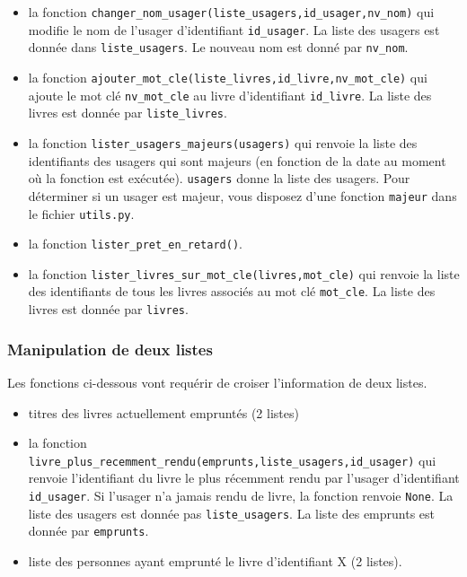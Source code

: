 \documentclass[10pt,a4paper]{sujets-exercices}
\begin{document}
\begin{itemize}

\item la fonction \texttt{changer\_nom\_usager(liste\_usagers,id\_usager,nv\_nom)} qui modifie le nom de l'usager d'identifiant \texttt{id\_usager}. La liste des usagers est donnée dans \texttt{liste\_usagers}. Le nouveau nom est donné par \texttt{nv\_nom}.

\item la fonction \texttt{ajouter\_mot\_cle(liste\_livres,id\_livre,nv\_mot\_cle)} qui ajoute le mot clé \texttt{nv\_mot\_cle} au livre d'identifiant \texttt{id\_livre}. La liste des livres est donnée par \texttt{liste\_livres}.

\item la fonction \texttt{lister\_usagers\_majeurs(usagers)} qui renvoie la liste des identifiants des usagers qui sont majeurs (en fonction de la date au moment où la fonction est exécutée). \texttt{usagers} donne la liste des usagers. Pour déterminer si un usager est majeur, vous disposez d'une fonction \texttt{majeur} dans le fichier \texttt{utils.py}.

\item la fonction \texttt{lister\_pret\_en\_retard()}.

\item la fonction \texttt{lister\_livres\_sur\_mot\_cle(livres,mot\_cle)} qui renvoie la liste des identifiants de tous les livres associés au mot clé \texttt{mot\_cle}. La liste des livres est donnée par \texttt{livres}.

\end{itemize}

\subsubsection{Manipulation de deux listes}

Les fonctions ci-dessous vont requérir de croiser l'information de deux listes.

\begin{itemize}

\item titres des livres actuellement empruntés (2 listes)

\item la fonction \texttt{livre\_plus\_recemment\_rendu(emprunts,liste\_usagers,id\_usager)} qui renvoie l'identifiant du livre le plus récemment rendu par l'usager d'identifiant \texttt{id\_usager}. Si l'usager n'a jamais rendu de livre, la fonction renvoie \texttt{None}. La liste des usagers est donnée pas \texttt{liste\_usagers}. La liste des emprunts est donnée par \texttt{emprunts}.

\item liste des personnes ayant emprunté le livre d'identifiant X (2 listes).

\end{itemize}
\end{document}
